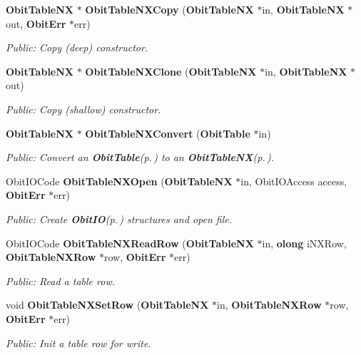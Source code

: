 \begin{CompactItemize}
{\bf Obit\-Table\-NX} $\ast$ {\bf Obit\-Table\-NXCopy} ({\bf Obit\-Table\-NX} $\ast$in, {\bf Obit\-Table\-NX} $\ast$out, {\bf Obit\-Err} $\ast$err)
\begin{CompactList}\small\item\em Public: Copy (deep) constructor. \item\end{CompactList}\item 
{\bf Obit\-Table\-NX} $\ast$ {\bf Obit\-Table\-NXClone} ({\bf Obit\-Table\-NX} $\ast$in, {\bf Obit\-Table\-NX} $\ast$out)
\begin{CompactList}\small\item\em Public: Copy (shallow) constructor. \item\end{CompactList}\item 
{\bf Obit\-Table\-NX} $\ast$ {\bf Obit\-Table\-NXConvert} ({\bf Obit\-Table} $\ast$in)
\begin{CompactList}\small\item\em Public: Convert an {\bf Obit\-Table}{\rm (p.\,\pageref{structObitTable})} to an {\bf Obit\-Table\-NX}{\rm (p.\,\pageref{structObitTableNX})}. \item\end{CompactList}\item 
Obit\-IOCode {\bf Obit\-Table\-NXOpen} ({\bf Obit\-Table\-NX} $\ast$in, Obit\-IOAccess access, {\bf Obit\-Err} $\ast$err)
\begin{CompactList}\small\item\em Public: Create {\bf Obit\-IO}{\rm (p.\,\pageref{structObitIO})} structures and open file. \item\end{CompactList}\item 
Obit\-IOCode {\bf Obit\-Table\-NXRead\-Row} ({\bf Obit\-Table\-NX} $\ast$in, {\bf olong} i\-NXRow, {\bf Obit\-Table\-NXRow} $\ast$row, {\bf Obit\-Err} $\ast$err)
\begin{CompactList}\small\item\em Public: Read a table row. \item\end{CompactList}\item 
void {\bf Obit\-Table\-NXSet\-Row} ({\bf Obit\-Table\-NX} $\ast$in, {\bf Obit\-Table\-NXRow} $\ast$row, {\bf Obit\-Err} $\ast$err)
\begin{CompactList}\small\item\em Public: Init a table row for write. \item\end{CompactList}\item 

\end{CompactItemize}
